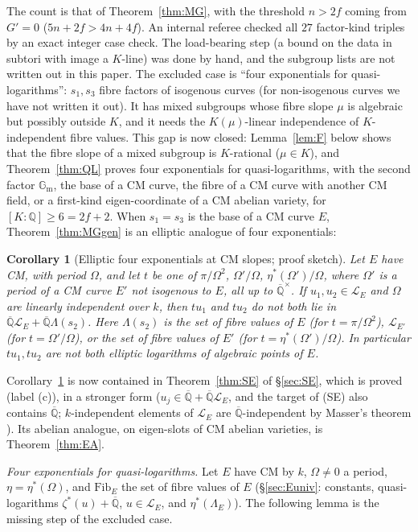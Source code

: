 \documentclass[11pt]{amsart}
\newtheorem{corollary}[theorem]{Corollary}
\theoremstyle{definition}
\newcommand{\Qb}{\overline{\mathbb{Q}}}
\newcommand{\Q}{\mathbb{Q}}
\newcommand{\Gm}{\mathbb{G}_{\mathrm m}}
\newcommand{\Lg}{\mathcal{L}}
\newcommand{\Fib}{\mathrm{Fib}}
\begin{document}
\noindent The count is that of Theorem~\ref{thm:MG}, with the threshold $n>2f$ coming from $G'=0$ ($5n+2f>4n+4f$). An
internal referee checked all $27$ factor-kind triples by an exact integer case check. The load-bearing step (a bound on the
data in subtori with image a $K$-line) was done by hand, and the subgroup lists are not written out in this paper. The
excluded case is ``four exponentials for quasi-logarithms'': $s_1,s_3$ fibre factors of isogenous curves (for
non-isogenous curves we have not written it out). It has mixed subgroups whose fibre slope $\mu$ is algebraic but possibly
outside $K$, and it needs the $K(\mu)$-linear independence of $K$-independent fibre values. This gap is now closed:
Lemma~\ref{lem:F} below shows that the fibre slope of a mixed subgroup is $K$-rational ($\mu\in K$), and
Theorem~\ref{thm:QL} proves four exponentials for quasi-logarithms, with the second factor $\Gm$, the base of a CM curve,
the fibre of a CM curve with another CM field, or a first-kind eigen-coordinate of a CM abelian variety, for
$[K:\Q]\ge6=2f+2$. When $s_1=s_3$ is the base of a CM
curve $E$, Theorem~\ref{thm:MGgen} is an elliptic analogue of four exponentials:

\begin{corollary}[Elliptic four exponentials at CM slopes; proof sketch]\label{cor:ell4E}
Let $E$ have CM, with period $\Omega$, and let $t$ be one of $\pi/\Omega^2$, $\Omega'/\Omega$, $\eta^*(\Omega')/\Omega$, where $\Omega'$ is
a period of a CM curve $E'$ not isogenous to $E$, all up to $\Qb^\times$. If $u_1,u_2\in\Lg_E$ and $\Omega$ are linearly
independent over $k$, then $tu_1$ and $tu_2$ do not both lie in $\Qb\Lg_E+\Qb\Lambda(s_2)$. Here $\Lambda(s_2)$ is the
set of fibre values of $E$ (for $t=\pi/\Omega^2$), $\Lg_{E'}$ (for $t=\Omega'/\Omega$), or the set of fibre values of $E'$ (for
$t=\eta^*(\Omega')/\Omega$). In particular $tu_1,tu_2$ are not both elliptic logarithms of algebraic points of $E$.
\end{corollary}

\noindent Corollary~\ref{cor:ell4E} is now contained in Theorem~\ref{thm:SE} of \S\ref{sec:SE}, which is proved (label
(c)), in a stronger form ($u_j\in\Qb+\Qb\Lg_E$, and the target of (SE) also contains $\Qb$; $k$-independent elements of
$\Lg_E$ are $\Qb$-independent by Masser's theorem \cite{Ma75}). Its abelian analogue, on eigen-slots
of CM abelian varieties, is Theorem~\ref{thm:EA}.

\medskip\noindent\emph{Four exponentials for quasi-logarithms.} Let $E$ have CM by $k$, $\Omega\ne0$ a period,
$\eta=\eta^*(\Omega)$, and $\Fib_E$ the set of fibre values of $E$ (\S\ref{sec:Euniv}: constants, quasi-logarithms
$\zeta^*(u)+\Qb$, $u\in\Lg_E$, and $\eta^*(\Lambda_E)$). The following lemma is the missing step of the excluded case.
\end{document}
